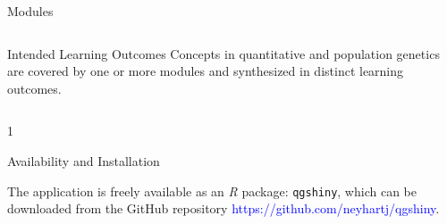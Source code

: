 \documentclass[final]{beamer}
\newlength{\onecolwid}
\newlength{\twocolwid}
\begin{document}
\begin{frame}[t]
\begin{columns}[t]
\begin{column}{\twocolwid}
\begin{block}{Modules}
\begin{columns}[t,totalwidth=\twocolwid]
\begin{column}{\onecolwid}
\begin{alertblock}{Intended Learning Outcomes}
Concepts in quantitative and population genetics are covered by one or more modules and synthesized in distinct learning outcomes.



\vspace{0.5cm}


\end{alertblock}

\end{column}


\end{columns}


\end{block}








\vspace{0cm}






\begin{columns}[t,totalwidth=\twocolwid] %


\begin{column}{1\onecolwid}


\begin{alertblock}{Availability and Installation}

\begin{footnotesize}

The application is freely available as an \textit{R} package: \texttt{qgshiny}, which can be downloaded from the GitHub repository \textcolor{blue}{https://github.com/neyhartj/qgshiny}.

\vspace{0.5cm}



\end{footnotesize}
\end{alertblock}
\end{column}
\end{columns}
\end{column}
\end{columns}
\end{frame}
\end{document}
